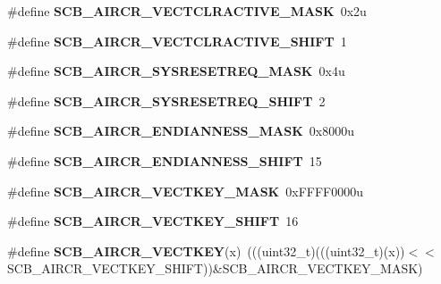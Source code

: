 \begin{DoxyCompactItemize}
\#define {\bfseries S\+C\+B\+\_\+\+A\+I\+R\+C\+R\+\_\+\+V\+E\+C\+T\+C\+L\+R\+A\+C\+T\+I\+V\+E\+\_\+\+M\+A\+SK}~0x2u
\item 
\mbox{\label{group___s_c_b___register___masks_gacc6a889c36f0c9d996ab29dc076eec6e}} 
\#define {\bfseries S\+C\+B\+\_\+\+A\+I\+R\+C\+R\+\_\+\+V\+E\+C\+T\+C\+L\+R\+A\+C\+T\+I\+V\+E\+\_\+\+S\+H\+I\+FT}~1
\item 
\mbox{\label{group___s_c_b___register___masks_gab69a066f25df4f52635379ca69f99b35}} 
\#define {\bfseries S\+C\+B\+\_\+\+A\+I\+R\+C\+R\+\_\+\+S\+Y\+S\+R\+E\+S\+E\+T\+R\+E\+Q\+\_\+\+M\+A\+SK}~0x4u
\item 
\mbox{\label{group___s_c_b___register___masks_ga858136a0c46c0a91e00af704cb3e2eb8}} 
\#define {\bfseries S\+C\+B\+\_\+\+A\+I\+R\+C\+R\+\_\+\+S\+Y\+S\+R\+E\+S\+E\+T\+R\+E\+Q\+\_\+\+S\+H\+I\+FT}~2
\item 
\mbox{\label{group___s_c_b___register___masks_gad1fa2d88f03b66dea86171ebb636d936}} 
\#define {\bfseries S\+C\+B\+\_\+\+A\+I\+R\+C\+R\+\_\+\+E\+N\+D\+I\+A\+N\+N\+E\+S\+S\+\_\+\+M\+A\+SK}~0x8000u
\item 
\mbox{\label{group___s_c_b___register___masks_ga2ac1c32de13b48a92bc48bbcee891976}} 
\#define {\bfseries S\+C\+B\+\_\+\+A\+I\+R\+C\+R\+\_\+\+E\+N\+D\+I\+A\+N\+N\+E\+S\+S\+\_\+\+S\+H\+I\+FT}~15
\item 
\mbox{\label{group___s_c_b___register___masks_ga0929f6fe9ab80dd345abdc59f44fc492}} 
\#define {\bfseries S\+C\+B\+\_\+\+A\+I\+R\+C\+R\+\_\+\+V\+E\+C\+T\+K\+E\+Y\+\_\+\+M\+A\+SK}~0x\+F\+F\+F\+F0000u
\item 
\mbox{\label{group___s_c_b___register___masks_ga81e3a91d7ab352abfc1227b928677c37}} 
\#define {\bfseries S\+C\+B\+\_\+\+A\+I\+R\+C\+R\+\_\+\+V\+E\+C\+T\+K\+E\+Y\+\_\+\+S\+H\+I\+FT}~16
\item 
\mbox{\label{group___s_c_b___register___masks_ga745798f4c865107588c47e04f2a95991}} 
\#define {\bfseries S\+C\+B\+\_\+\+A\+I\+R\+C\+R\+\_\+\+V\+E\+C\+T\+K\+EY}(x)~(((uint32\+\_\+t)(((uint32\+\_\+t)(x))$<$$<$S\+C\+B\+\_\+\+A\+I\+R\+C\+R\+\_\+\+V\+E\+C\+T\+K\+E\+Y\+\_\+\+S\+H\+I\+FT))\&S\+C\+B\+\_\+\+A\+I\+R\+C\+R\+\_\+\+V\+E\+C\+T\+K\+E\+Y\+\_\+\+M\+A\+SK)
$$
\end{DoxyCompactItemize}

